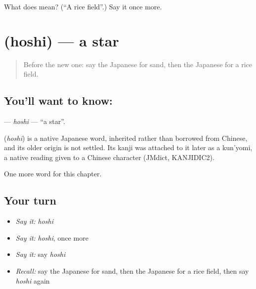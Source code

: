 \begin{tcolorbox}[breakable,colback=teal!4,colframe=teal!35!black,title={Before you move on}]
What does  mean? (\textquotedblleft{}A rice field\textquotedblright{}.) Say it once more.
\end{tcolorbox}
\section[\texorpdfstring{\ja{ほし} (hoshi)}{ほし (hoshi)}]{ (hoshi) — a star}

\label{lesson:JA-C43-hoshi}



\begin{quote}
Before the new one: say the Japanese for sand, then the Japanese for a rice field.
\end{quote}

\subsection*{You'll want to know: }
\textbf{} — \emph{hoshi} — \textquotedblleft{}a star\textquotedblright{}.

\begin{cousinweb}
\textbf{} (\emph{hoshi}) is a native Japanese word, inherited rather than borrowed from Chinese, and its older origin is not settled. Its kanji was attached to it later as a kun'yomi, a native reading given to a Chinese character (JMdict, KANJIDIC2).
\end{cousinweb}

\begin{grammarlens}[title={What you've built}]
One more word for this chapter.
\end{grammarlens}

\subsection*{Your turn}
\begin{itemize}
\raggedright
  \item \emph{Say it:} \emph{hoshi}
  \item \emph{Say it:} \emph{hoshi}, once more
  \item \emph{Say it:} say \emph{hoshi}
  \item \emph{Recall:} say the Japanese for sand, then the Japanese for a rice field, then say \emph{hoshi} again
\end{itemize}

